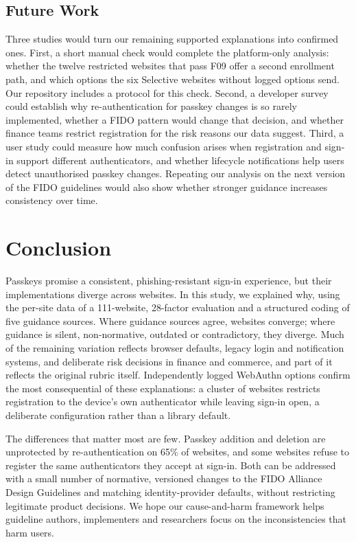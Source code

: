 \documentclass[letterpaper,twocolumn,10pt]{article}
\begin{document}
\subsection{Future Work}

Three studies would turn our remaining supported explanations into confirmed ones. First, a short manual check would complete the platform-only analysis: whether the twelve restricted websites that pass F09 offer a second enrollment path, and which options the six Selective websites without logged options send. Our repository includes a protocol for this check. Second, a developer survey could establish why re-authentication for passkey changes is so rarely implemented, whether a FIDO pattern would change that decision, and whether finance teams restrict registration for the risk reasons our data suggest. Third, a user study could measure how much confusion arises when registration and sign-in support different authenticators, and whether lifecycle notifications help users detect unauthorised passkey changes. Repeating our analysis on the next version of the FIDO guidelines would also show whether stronger guidance increases consistency over time.

\section{Conclusion}

Passkeys promise a consistent, phishing-resistant sign-in experience, but their implementations diverge across websites. In this study, we explained why, using the per-site data of a 111-website, 28-factor evaluation and a structured coding of five guidance sources. Where guidance sources agree, websites converge; where guidance is silent, non-normative, outdated or contradictory, they diverge. Much of the remaining variation reflects browser defaults, legacy login and notification systems, and deliberate risk decisions in finance and commerce, and part of it reflects the original rubric itself. Independently logged WebAuthn options confirm the most consequential of these explanations: a cluster of websites restricts registration to the device's own authenticator while leaving sign-in open, a deliberate configuration rather than a library default.

The differences that matter most are few. Passkey addition and deletion are unprotected by re-authentication on 65\% of websites, and some websites refuse to register the same authenticators they accept at sign-in. Both can be addressed with a small number of normative, versioned changes to the FIDO Alliance Design Guidelines and matching identity-provider defaults, without restricting legitimate product decisions. We hope our cause-and-harm framework helps guideline authors, implementers and researchers focus on the inconsistencies that harm users.
\end{document}
